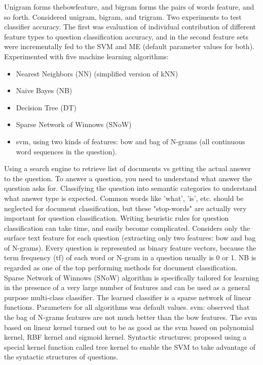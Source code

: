 Unigram forms the\gls{bow}feature, and bigram forms the pairs of words feature, and so forth. 
Considered unigram, bigram, and trigram.
Two experiments to test classifier accuracy.
The first was evaluation of individual contribution of different feature types to question classification accuracy, 
and in the second feature sets were incrementally fed to the SVM and ME (default parameter values for both). \\
Experimented with five machine learning algorithms: 
\begin{itemize}
	\item Nearest Neighbors (NN) (simplified version of kNN)
	\item Naive Bayes (NB)
	\item Decision Tree (DT)
	\item Sparse Network of Winnows (SNoW)
	\item \gls{svm}, using two kinds of features: \gls{bow} and bag of N-grams (all continuous word sequences in the question).
\end{itemize}
Using a search engine to retrieve list of documents vs getting the actual answer to the question. 
To answer a question, you need to understand what answer the question asks for. 
Classifying the question into semantic categories to understand what answer type is expected. 
Common words like 'what', 'is', etc. should be neglected for document classification, but these "stop-words" are actually very important for question classification. 
Writing heuristic rules for question classification can take time, and easily become complicated.
Considers only the surface text feature for each question (extracting only two features: \gls{bow} and bag of N-grams).
Every question is represented as binary feature vectors, because the term frequency (tf) of each word or N-gram in a question usually is 0 or 1.
NB is regarded as one of the top performing methods for document classification. 
Sparse Network of Winnows (SNoW) algorithm is specifically tailored for learning in the presence of a very large number of features and can be used as a general purpose multi-class classifier. 
The learned classifier is a sparse network of linear functions. 
Parameters for all algorithms was default values. 
\gls{svm}: observed that the bag of N-grams features are not much better than the \gls{bow} features. 
The \gls{svm} based on linear kernel turned out to be as good as the \gls{svm} based on polynomial kernel, RBF kernel and sigmoid kernel.
Syntactic structures; proposed using a special kernel function called tree kernel to enable the SVM to take advantage of the syntactic structures of questions.
\cite{Zhang2003}




